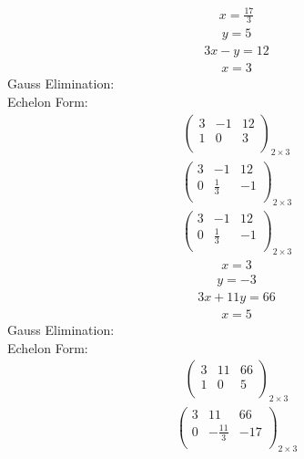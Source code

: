 \documentclass{article}
\begin{document}
\begin{align*}
x=\frac{17}{3}\end{align*}
\begin{align*}
y=5\end{align*}
\begin{align*}
3x - y=12\end{align*}
\begin{align*}
x=3\end{align*}
Gauss Elimination:\\
Echelon Form:\\
\begin{align*}
\left(
\begin{array}{cc|c}
3 & -1 & 12\\
1 & 0 & 3\\
\end{array}
\right)_{2\times 3}
\end{align*}
\begin{align*}
\left(
\begin{array}{cc|c}
3 & -1 & 12\\
0 & \frac{1}{3} & -1\\
\end{array}
\right)_{2\times 3}
\end{align*}
\begin{align*}
\left(
\begin{array}{cc|c}
3 & -1 & 12\\
0 & \frac{1}{3} & -1\\
\end{array}
\right)_{2\times 3}
\end{align*}
\begin{align*}
x=3\end{align*}
\begin{align*}
y=-3\end{align*}
\begin{align*}
3x + 11y=66\end{align*}
\begin{align*}
x=5\end{align*}
Gauss Elimination:\\
Echelon Form:\\
\begin{align*}
\left(
\begin{array}{cc|c}
3 & 11 & 66\\
1 & 0 & 5\\
\end{array}
\right)_{2\times 3}
\end{align*}
\begin{align*}
\left(
\begin{array}{cc|c}
3 & 11 & 66\\
0 & -\frac{11}{3} & -17\\
\end{array}
\right)_{2\times 3}
\end{align*}
\end{document}
